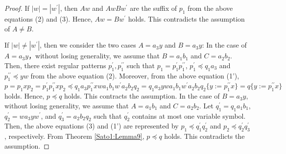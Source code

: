 \begin{proof}
\noindent
If $|w|=|w^{\prime}|$, then $Aw$ and $AwBw^{\prime}$ are the suffix of $p_{1}$ from the above equations (2) and (3).
Hence, $Aw=Bw^{\prime}$ holds.
This contradicts the assumption of $A \ne B$.

\noindent
If $|w| \ne |w^{\prime}|$, then we consider the two cases $A=a_{3}y$ and $B=a_{3}y$:
In the case of $A=a_{3}y$，without losing generality, we assume that $B=a_{1}b_{1}$ and $C=a_{2}b_{2}$. 
Then, there exist regular patterns $p_{1}^{\prime}, p_{1}^{\prime\prime}$ such that $p_{1}=p_{1}^{\prime}p_{1}^{\prime\prime}$, $p_{1}^{\prime} \preceq q_{1}a_{3}$ and $p_{1}^{\prime\prime} \preceq yw$ from the above equation (2).
Moreover, from the above equation (1'), $p=p_{1}xp_{2}=p_{1}^{\prime}p_{1}^{\prime\prime}xp_{2}\preceq q_{1}a_{3}p_{1}^{\prime\prime}xwa_{1}b_{1}w^{\prime}a_{2}b_{2}q_{2}=
q_{1}a_{3}ywa_{1}b_{1}w^{\prime}a_{2}b_{2}q_{2}\{ y := p_{1}^{\prime\prime}x \}=q \{ y := p_{1}^{\prime\prime}x \}$ holds.
Hence, $p \preceq q$ holds.
This contracts the assumption.
In the case of $B=a_{3}y$, without losing generality, we assume that $A=a_{1}b_{1}$ and $C=a_{2}b_{2}$.
Let $q_{1}^{\prime}=q_{1}a_{1}b_{1}$, $q_{2}^{\prime}=wa_{3}yw^{\prime}$, and $q_{3}^{\prime}=a_{2}b_{2}q_{2}$ such that $q_{2}^{\prime}$ contains at most one variable symbol.
Then, the above equations (3) and (1') are represented by $p_{1} \preceq q_{1}^{\prime}q_{2}^{\prime}$ and $p_{2} \preceq q_{2}^{\prime}q_{3}^{\prime}$, respectively.
From Theorem \ref{Sato1:Lemma9}, $p \preceq q$ holds.
This contradicts the assumption.



\end{proof}
